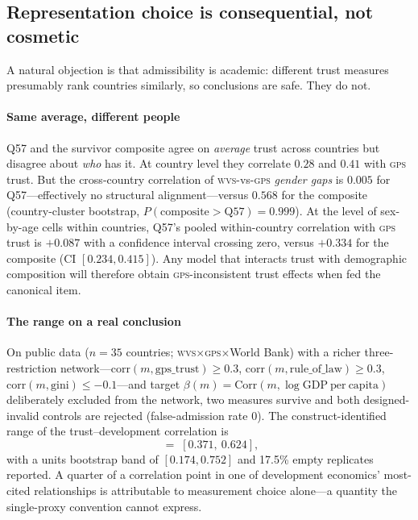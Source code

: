 \documentclass[11pt,letterpaper]{article}
\newcommand{\GPS}{\textsc{gps}}
\newcommand{\WVS}{\textsc{wvs}}
\begin{document}
\subsection{Representation choice is consequential, not cosmetic}

A natural objection is that admissibility is academic: different trust measures presumably rank countries
similarly, so conclusions are safe. They do not.

\paragraph{Same average, different people} Q57 and the survivor composite agree on \emph{average} trust across
countries but disagree about \emph{who} has it. At country level they correlate $0.28$ and $0.41$ with \GPS{}
trust. But the cross-country correlation of \WVS{}-vs-\GPS{} \emph{gender gaps} is $0.005$ for
Q57---effectively no structural alignment---versus $0.568$ for the composite (country-cluster bootstrap,
$P(\text{composite} > \text{Q57}) = 0.999$). At the level of sex-by-age cells within countries, Q57's pooled
within-country correlation with \GPS{} trust is $+0.087$ with a confidence interval crossing zero, versus
$+0.334$ for the composite (CI $[0.234, 0.415]$). Any model that interacts trust with demographic composition
will therefore obtain \GPS{}-inconsistent trust effects when fed the canonical item.

\paragraph{The range on a real conclusion} On public data ($n=35$ countries; \WVS{}$\times$\GPS{}$\times$World
Bank) with a richer three-restriction network---$\mathrm{corr}(m,\mathrm{gps\_trust}) \ge 0.3$,
$\mathrm{corr}(m,\mathrm{rule\_of\_law}) \ge 0.3$, $\mathrm{corr}(m,\mathrm{gini}) \le -0.1$---and target
$\beta(m) = \mathrm{Corr}(m, \log \mathrm{GDP\ per\ capita})$ deliberately excluded from the network, two
measures survive and both designed-invalid controls are rejected (false-admission rate $0$). The
construct-identified range of the trust--development correlation is
\begin{equation}
  [\widehat L, \widehat U] \;=\; [0.371,\ 0.624],
\end{equation}
with a units bootstrap band of $[0.174, 0.752]$ and 17.5\% empty replicates reported. A quarter of a
correlation point in one of development economics' most-cited relationships is attributable to measurement
choice alone---a quantity the single-proxy convention cannot express.
\end{document}
